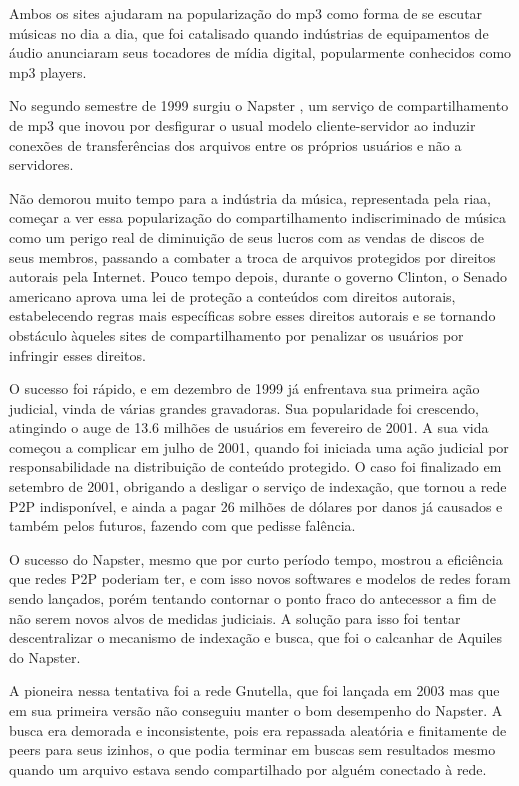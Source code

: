 Ambos os sites ajudaram na popularização do \gls*{mp3} como forma de se escutar
músicas no dia a dia, que foi catalisado quando indústrias de equipamentos de áudio
anunciaram seus tocadores de mídia digital, popularmente conhecidos como \gls*{mp3}
players.

No segundo semestre de 1999 surgiu o Napster \cite{site:wiki-napster}, um serviço de
compartilhamento de \gls*{mp3} que inovou por desfigurar o usual modelo cliente-servidor
ao induzir conexões de transferências dos arquivos entre os próprios usuários e não
a servidores.

Não demorou muito tempo para a indústria da música, representada pela \gls{riaa},
começar a ver essa popularização do compartilhamento indiscriminado de música como um perigo real de diminuição de seus lucros com as vendas de discos de seus membros,
passando a combater a troca de arquivos protegidos por direitos autorais
pela Internet. Pouco tempo depois, durante o governo Clinton, o Senado americano aprova
uma lei de proteção a conteúdos com direitos autorais, estabelecendo regras mais
específicas sobre esses direitos autorais e se tornando obstáculo àqueles sites de
compartilhamento por penalizar os usuários por infringir esses direitos.



O sucesso foi rápido, e em dezembro de 1999 já enfrentava sua primeira ação judicial,
vinda de várias grandes gravadoras. Sua popularidade foi crescendo, atingindo o auge de
13.6 milhões de usuários em fevereiro de 2001. A sua vida começou a complicar em julho de
2001, quando foi iniciada uma ação judicial por responsabilidade na distribuição de
conteúdo protegido. O caso foi finalizado em setembro de 2001, obrigando a desligar o
serviço de indexação, que tornou a rede P2P indisponível, e ainda a pagar 26 milhões de
dólares por danos já causados e também pelos futuros, fazendo com que pedisse falência.

O sucesso do Napster, mesmo que por curto período tempo, mostrou a eficiência que redes
P2P poderiam ter, e com isso novos softwares e modelos de redes foram sendo lançados,
porém tentando contornar o ponto fraco do antecessor a fim de não serem novos alvos de
medidas judiciais. A solução para isso foi tentar descentralizar o mecanismo de indexação
e busca, que foi o calcanhar de Aquiles do Napster.

A pioneira nessa tentativa foi a rede Gnutella, que foi lançada em 2003 mas que em sua
primeira versão não conseguiu manter o bom desempenho do Napster. A busca era demorada e
inconsistente, pois era repassada aleatória e finitamente de peers para seus izinhos, o
que podia terminar em buscas sem resultados mesmo quando um arquivo estava sendo
compartilhado por alguém conectado à rede.

